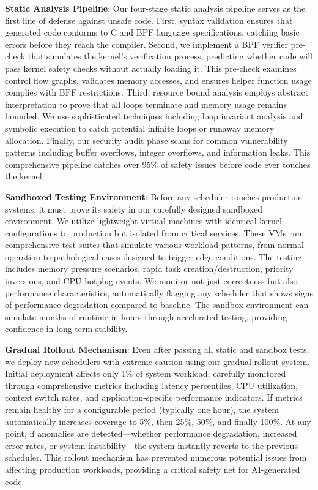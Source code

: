\textbf{Static Analysis Pipeline}: Our four-stage static analysis pipeline serves as the first line of defense against unsafe code. First, syntax validation ensures that generated code conforms to C and BPF language specifications, catching basic errors before they reach the compiler. Second, we implement a BPF verifier pre-check that simulates the kernel's verification process, predicting whether code will pass kernel safety checks without actually loading it. This pre-check examines control flow graphs, validates memory accesses, and ensures helper function usage complies with BPF restrictions. Third, resource bound analysis employs abstract interpretation to prove that all loops terminate and memory usage remains bounded. We use sophisticated techniques including loop invariant analysis and symbolic execution to catch potential infinite loops or runaway memory allocation. Finally, our security audit phase scans for common vulnerability patterns including buffer overflows, integer overflows, and information leaks. This comprehensive pipeline catches over 95\% of safety issues before code ever touches the kernel.

\textbf{Sandboxed Testing Environment}: Before any scheduler touches production systems, it must prove its safety in our carefully designed sandboxed environment. We utilize lightweight virtual machines with identical kernel configurations to production but isolated from critical services. These VMs run comprehensive test suites that simulate various workload patterns, from normal operation to pathological cases designed to trigger edge conditions. The testing includes memory pressure scenarios, rapid task creation/destruction, priority inversions, and CPU hotplug events. We monitor not just correctness but also performance characteristics, automatically flagging any scheduler that shows signs of performance degradation compared to baseline. The sandbox environment can simulate months of runtime in hours through accelerated testing, providing confidence in long-term stability.

\textbf{Gradual Rollout Mechanism}: Even after passing all static and sandbox tests, we deploy new schedulers with extreme caution using our gradual rollout system. Initial deployment affects only 1\% of system workload, carefully monitored through comprehensive metrics including latency percentiles, CPU utilization, context switch rates, and application-specific performance indicators. If metrics remain healthy for a configurable period (typically one hour), the system automatically increases coverage to 5\%, then 25\%, 50\%, and finally 100\%. At any point, if anomalies are detected—whether performance degradation, increased error rates, or system instability—the system instantly reverts to the previous scheduler. This rollout mechanism has prevented numerous potential issues from affecting production workloads, providing a critical safety net for AI-generated code.

